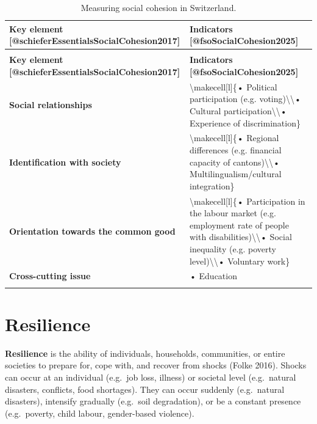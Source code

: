 \documentclass[
  a4paper,
  DIV=11,
  numbers=noendperiod,
  oneside,
  openany]{scrreprt}
\begin{document}
\begin{longtable}[t]{>{\raggedright\arraybackslash}p{5.5cm}>{\raggedright\arraybackslash}p{5.5cm}}

\caption{\label{tbl-social-cohesion-switzerland}Measuring social
cohesion in Switzerland.}

\tabularnewline

\toprule
\textbf{Key element [@schieferEssentialsSocialCohesion2017]} & \textbf{Indicators [@fsoSocialCohesion2025]}\\
\midrule
\endfirsthead
\multicolumn{2}{@{}l}{\textit{(continued)}}\\
\toprule
\textbf{Key element [@schieferEssentialsSocialCohesion2017]} & \textbf{Indicators [@fsoSocialCohesion2025]}\\
\midrule
\endhead

\endfoot
\bottomrule
\endlastfoot
\textbf{Social relationships} & \textbackslash{}makecell[l]\{• Political participation (e.g. voting)\textbackslash{}\textbackslash{}• Cultural participation\textbackslash{}\textbackslash{}• Experience of discrimination\}\\
\textbf{Identification with society} & \textbackslash{}makecell[l]\{• Regional differences (e.g. financial capacity of cantons)\textbackslash{}\textbackslash{}• Multilingualism/cultural integration\}\\
\textbf{Orientation towards the common good} & \textbackslash{}makecell[l]\{• Participation in the labour market (e.g. employment rate of people with disabilities)\textbackslash{}\textbackslash{}• Social inequality (e.g. poverty level)\textbackslash{}\textbackslash{}• Voluntary work\}\\
\textbf{Cross-cutting issue} & • Education\\*

\end{longtable}

\endgroup{}

\section{Resilience}\label{resilience}

\textbf{Resilience} is the ability of individuals, households,
communities, or entire societies to prepare for, cope with, and recover
from shocks (Folke 2016). Shocks can occur at an individual (e.g.~job
loss, illness) or societal level (e.g.~natural disasters, conflicts,
food shortages). They can occur suddenly (e.g.~natural disasters),
intensify gradually (e.g.~soil degradation), or be a constant presence
(e.g.~poverty, child labour, gender-based violence).
\end{document}
